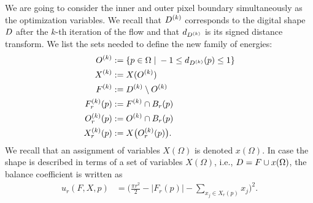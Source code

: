 %
%
%
%
%
%
%



We are going to consider the inner and outer pixel boundary simultaneously as the optimization variables. We recall that $D^{(k)}$ corresponds to the digital shape $D$ after the $k$-th iteration of the flow and that $d_{D^{(k)}}$ is its signed distance transform. We list the sets needed to define the new family of energies:
\begin{align*}
	O^{(k)} &:=\left\{ p \in \Omega \; | \; -1 \leq d_{D^{(k)}}(p) \leq 1 \right\}\\
	X^{(k)} &:= X(O^{(k)})  \\
	F^{(k)} &:= D^{(k)} \setminus O^{(k)} \\
	F_r^{(k)}(p) &:= F^{(k)} \cap B_r(p)\\
	O_r^{(k)}(p) &:= O^{(k)} \cap B_r(p) \\
	X_r^{(k)}(p) &:= X\big( O_r^{(k)}(p) \big).
\end{align*}
%
We recall that an assignment of variables $X(\Omega)$ is denoted $x(\Omega)$. In case the shape is described in terms of a set of variables $X(\Omega)$, i.e., $D=F \cup x(\Omega)$,  the balance coefficient is written as
\begin{align*}
	u_r(F,X,p) &=  \Big( \frac{\pi r^2}{2} - |F_r(p)| - \sum_{x_j \in X_r(p)}{x_j} \Big)^2.
\end{align*}
%
